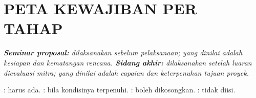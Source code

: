 \chapter*{PETA KEWAJIBAN PER TAHAP}
\thispagestyle{capstone}
{\itshape\textbf{Seminar proposal:} dilaksanakan sebelum pelaksanaan; yang dinilai adalah kesiapan dan kematangan rencana. \textbf{Sidang akhir:} dilaksanakan setelah luaran dievaluasi mitra; yang dinilai adalah capaian dan keterpenuhan tujuan proyek.\par}

{\footnotesize\singlespacing
{}: harus ada. : bila kondisinya terpenuhi. : boleh dikosongkan. : tidak diisi.\par}

